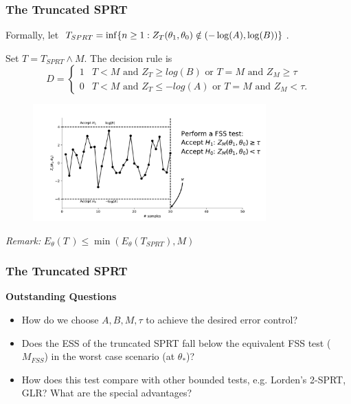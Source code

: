 \documentclass[10pt]{beamer}
\begin{document}
\begin{frame}
\frametitle{The Truncated SPRT}

Formally, let $T_{SPRT} = \inf\{n \geq 1 : Z_{T}(\theta_1, \theta_0) \notin (-\log(A), \log(B)) \}$.

Set $T = T_{SPRT} \wedge M$. The decision rule is
\[
D =
\begin{cases}
1  & T < M \text{ and } Z_T \geq log(B) \text{ or } T = M \text{ and } Z_M \geq \tau \\
0  & T < M \text{ and } Z_T \leq -log(A) \text{ or } T = M \text{ and } Z_M < \tau .
\end{cases}
\]

\begin{figure}
\centering
\includegraphics[height=0.45\textheight, width=0.8\textwidth]{images/truncated_sprt}
\end{figure}

\textit{Remark:} $E_{\theta}(T\,) \leq \min(E_{\theta}(T_{SPRT}), M)$
\end{frame}

\begin{frame}
\frametitle{The Truncated SPRT}
\textbf{Outstanding Questions}

\begin{itemize}
\item How do we choose $A, B, M, \tau$ to achieve the desired error control?
\item Does the ESS of the truncated SPRT fall below the equivalent FSS test ($M_{FSS}$) in the worst case scenario (at $\theta_{*}$)?
\item How does this test compare with other bounded tests, e.g. Lorden's 2-SPRT, GLR? What are the special advantages?
\end{itemize}

\end{frame}
\end{document}
